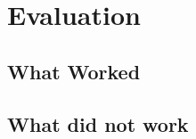 \section{Evaluation}\label{sec:evaluation}


\subsection{What Worked}

\subsection{What did not work}

